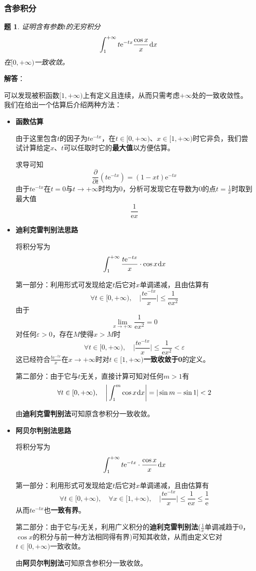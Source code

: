 \documentclass[a4paper,UTF8,fontset=windows,AutoFakeBold]{ctexart}
\newcommand*{\dr}{\hspace{0.07em}\mathrm{d}}
\newcommand*{\er}{\mathrm{e}}
\theoremstyle{ex}
\newtheorem{exercise}{题}
\newcommand{\sol}[1]{{\vspace{5pt}\kaishu\noindent\textbf{解答}：\vspace{-3pt}
\begin{compactitem}
    \item[] #1
\end{compactitem}
}}
\begin{document}
\subsubsection{含参积分}
\begin{framed}
\begin{exercise}
    证明含有参数$t$的无穷积分
    $$\int_1^{+\infty}t\er^{-tx}\frac{\cos x}{x}\dr x$$
    在$[0,+\infty)$一致收敛。
\end{exercise}
\sol{
    可以发现被积函数$[1,+\infty)$上有定义且连续，从而只需考虑$+\infty$处的一致收敛性。我们在给出一个估算后介绍两种方法：
    \begin{itemize}
        \item \textbf{函数估算}
        
        由于这里包含$t$的因子为$t\er^{-tx}$，在$t\in[0,+\infty)$、$x\in[1,+\infty)$时它非负，我们尝试计算给定$x$、$t$可以任取时它的\textbf{最大值}以方便估算。

        求导可知
        $$\frac{\partial}{\partial t}(t\er^{-tx})=(1-xt)\er^{-tx}$$
        由于$t\er^{-tx}$在$t=0$与$t\to+\infty$时均为0，分析可发现它在导数为0的点$t=\frac{1}{x}$时取到最大值
        $$\frac{1}{\er x}$$

        \item \textbf{迪利克雷判别法思路}
        
        将积分写为
        $$\int_1^{+\infty}\frac{t\er^{-tx}}{x}\cdot\cos x\dr x$$

        第一部分：利用形式可发现给定$t$后它对$x$单调递减，且由估算有
        $$\forall t\in[0,+\infty),\quad\bigg|\frac{t\er^{-tx}}{x}\bigg|\le\frac{1}{\er x^2}$$
        由于
        $$\lim_{x\to+\infty}\frac{1}{\er x^2}=0$$
        对任何$\varepsilon>0$，存在$M$使得$x>M$时
        $$\forall t\in[0,+\infty),\quad\bigg|\frac{t\er^{-tx}}{x}\bigg|\le\frac{1}{\er x^2}<\varepsilon$$
        这已经符合$\frac{t\er^{-tx}}{x}$在$x\to+\infty$时对$t\in[1,+\infty)$\textbf{一致收敛于0}的定义。

        第二部分：由于它与$t$无关，直接计算可知对任何$m>1$有
        $$\forall t\in[0,+\infty),\quad\bigg|\int_1^m\cos x\dr x\bigg|=|\sin m-\sin1|<2$$

        由\textbf{迪利克雷判别法}可知原含参积分一致收敛。       

        \item \textbf{阿贝尔判别法思路}
        
        将积分写为
        $$\int_1^{+\infty}t\er^{-tx}\cdot\frac{\cos x}{x}\dr x$$

        第一部分：利用形式可发现给定$t$后它对$x$单调递减，且由估算有
        $$\forall t\in[0,+\infty),\quad\forall x\in[1,+\infty),\quad\bigg|\frac{t\er^{-tx}}{x}\bigg|\le\frac{1}{\er x}\le\frac{1}{\er}$$
        从而$t\er^{-tx}$也\textbf{一致有界}。

        第二部分：由于它与$t$无关，利用广义积分的\textbf{迪利克雷判别法}($\frac{1}{x}$单调减趋于0，$\cos x$的积分与前一种方法相同得有界)可知其收敛，从而由定义它对$t\in[0,+\infty)$一致收敛。

        由\textbf{阿贝尔判别法}可知原含参积分一致收敛。 
    \end{itemize}
}
\end{framed}
\end{document}
